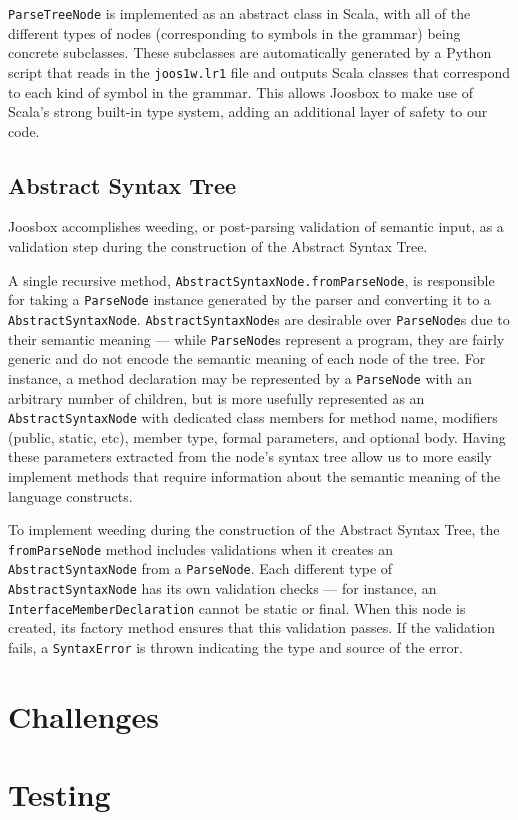 \documentclass[letterpaper]{article}
\begin{document}
  {\tt ParseTreeNode} is implemented as an abstract class in Scala, with all
  of the different types of nodes (corresponding to symbols in the grammar)
  being concrete subclasses. These subclasses are automatically generated
  by a Python script that reads in the {\tt joos1w.lr1} file and outputs
  Scala classes that correspond to each kind of symbol in the grammar. This
  allows Joosbox to make use of Scala's strong built-in type system, adding
  an additional layer of safety to our code.

  \subsection{Abstract Syntax Tree}

  Joosbox accomplishes weeding, or post-parsing validation of semantic input,
  as a validation step during the construction of the Abstract Syntax Tree.

  A single recursive method, {\tt AbstractSyntaxNode.fromParseNode}, is
  responsible for taking a {\tt ParseNode} instance generated by the parser
  and converting it to a {\tt AbstractSyntaxNode}. {\tt AbstractSyntaxNode}s
  are desirable over {\tt ParseNode}s due to their semantic meaning --- while
  {\tt ParseNode}s represent a program, they are fairly generic and do not
  encode the semantic meaning of each node of the tree. For instance, a method
  declaration may be represented by a {\tt ParseNode} with an arbitrary number
  of children, but is more usefully represented as an {\tt AbstractSyntaxNode}
  with dedicated class members for method name, modifiers (public, static,
  etc), member type, formal parameters, and optional body. Having these
  parameters extracted from the node's syntax tree allow us to more easily
  implement methods that require information about the semantic meaning of the
  language constructs.

  To implement weeding during the construction of the Abstract Syntax Tree,
  the {\tt fromParseNode} method includes validations when it creates an {\tt
  AbstractSyntaxNode} from a {\tt ParseNode}. Each different type of {\tt
  AbstractSyntaxNode}  has its own validation checks --- for instance, an {\tt
  InterfaceMemberDeclaration} cannot be static  or final. When this node is
  created, its factory method ensures that this validation passes. If the
  validation  fails, a {\tt SyntaxError} is thrown indicating the type and
  source of the error.

  \section{Challenges}


  \section{Testing}

\end{document}
